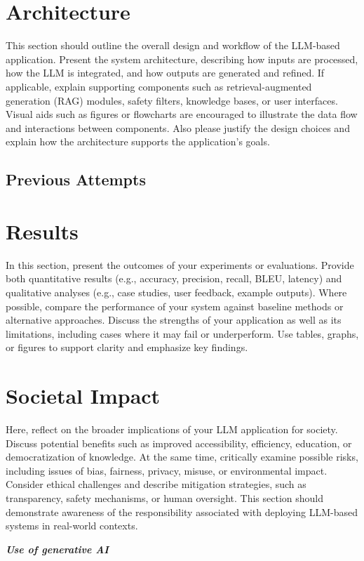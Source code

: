 \documentclass[a4paper,10pt]{article}
\begin{document}
\section{Architecture}
This section should outline the overall design and workflow of the LLM-based application. Present the system architecture, describing how inputs are processed, how the LLM is integrated, and how outputs are generated and refined. If applicable, explain supporting components such as retrieval-augmented generation (RAG) modules, safety filters, knowledge bases, or user interfaces. Visual aids such as figures or flowcharts are encouraged to illustrate the data flow and interactions between components. Also please justify the design choices and explain how the architecture supports the application's goals.
\subsection{Previous Attempts}

\section{Results}
In this section, present the outcomes of your experiments or evaluations. Provide both quantitative results (e.g., accuracy, precision, recall, BLEU, latency) and qualitative analyses (e.g., case studies, user feedback, example outputs). Where possible, compare the performance of your system against baseline methods or alternative approaches. Discuss the strengths of your application as well as its limitations, including cases where it may fail or underperform. Use tables, graphs, or figures to support clarity and emphasize key findings.

\section{Societal Impact}
Here, reflect on the broader implications of your LLM application for society. Discuss potential benefits such as improved accessibility, efficiency, education, or democratization of knowledge. At the same time, critically examine possible risks, including issues of bias, fairness, privacy, misuse, or environmental impact. Consider ethical challenges and describe mitigation strategies, such as transparency, safety mechanisms, or human oversight. This section should demonstrate awareness of the responsibility associated with deploying LLM-based systems in real-world contexts.

	
\hfill \break
\textit{\textbf{Use of generative AI}}
\end{document}
